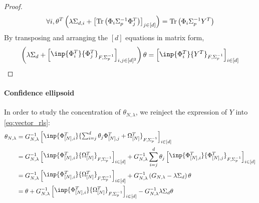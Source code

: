 \documentclass{article}
\begin{document}
\begin{proof}
\begin{align*}
    \forall i,  \theta^T\left(\lambda\Sigma_{d,i} + \begin{bmatrix}
    \operatorname{Tr}\left(\Phi_i \Sigma_p^{-1} \Phi_j^T\right)
    \end{bmatrix}_{j\in[d]}\right)
     = \operatorname{Tr}\left(\Phi_{i}\Sigma_p^{-1}Y^T\right)
\end{align*}
By transposing and arranging the $[d]$ equations in matrix form,
\begin{align*}
    \left(\lambda\Sigma_{d} + \begin{bmatrix}
    \inp{\Phi_{i}^T}{\Phi_{j}^T}_{F,\Sigma_p^{-1}}
    \end{bmatrix}_{i,j\in[d]^2}\right)\theta
     = \begin{bmatrix}\inp{\Phi_{i}^T}{Y^T}_{F,\Sigma_p^{-1}}\end{bmatrix}_{i\in[d]}
\end{align*}

\end{proof}

\paragraph{Confidence ellipsoid}

In order to study the concentration of $\theta_{N,\lambda}$, we reinject the expression of $Y$ into \eqref{eq:vector_rls}:
\begin{align*}
    \theta_{N,\lambda} &= G_{N, \lambda}^{-1} \begin{bmatrix}\inp{\Phi_{[N],i}^T}{\sum_{i=j}^d\theta_j\Phi_{[N],j}^T  + \Omega_{[N]}^T}_{F, \Sigma_p^{-1}}\end{bmatrix}_{i\in[d]}\\
    &= G_{N, \lambda}^{-1}\begin{bmatrix}\inp{\Phi_{[N],i}^T}{\Omega_{[N]}^T}_{F, \Sigma_p^{-1}}\end{bmatrix}_{i\in[d]} + 
    G_{N, \lambda}^{-1} \sum_{i=j}^d\theta_j\begin{bmatrix}\inp{\Phi_{[N],i}^T}{\Phi_{[N],j}^T}_{F, \Sigma_p^{-1}}\end{bmatrix}_{i\in[d]}\\
    &= G_{N, \lambda}^{-1}\begin{bmatrix}\inp{\Phi_{[N],i}^T}{\Omega_{[N]}^T}_{F, \Sigma_p^{-1}}\end{bmatrix}_{i\in[d]} + 
    G_{N, \lambda}^{-1}\left(G_{N, \lambda}-\lambda\Sigma_d\right)\theta\\
    &= \theta + G_{N, \lambda}^{-1}\begin{bmatrix}\inp{\Phi_{[N],i}^T}{\Omega_{[N]}^T}_{F, \Sigma_p^{-1}}\end{bmatrix}_{i\in[d]} -
    G_{N, \lambda}^{-1}\lambda\Sigma_d\theta
\end{align*}
\end{document}
